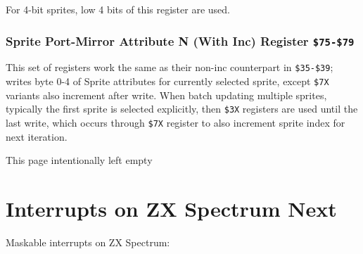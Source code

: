\documentclass[12pt,twoside,openright,a4paper]{book}
\newcommand{\intentiallyempty}{
	\mbox{}
	\vfill
	\begin{center}
	This page intentionally left empty
	\end{center}
	\vfill
	\mbox{}
}
\begin{document}
For 4-bit sprites, low 4 bits of this register are used.


\subsubsection{Sprite Port-Mirror Attribute N (With Inc) Register {\tt \$75-\$79}}

This set of registers work the same as their non-inc counterpart in {\tt \$35-\$39}; writes byte 0-4 of Sprite attributes for currently selected sprite, except {\tt \$7X} variants also increment  after write. When batch updating multiple sprites, typically the first sprite is selected explicitly, then {\tt \$3X} registers are used until the last write, which occurs through {\tt \$7X} register to also increment sprite index for next iteration.


\pagebreak
\intentiallyempty
\pagebreak


\section{Interrupts on ZX Spectrum Next}
\label{zx_next_interrupts}


Maskable interrupts on ZX Spectrum:
\end{document}
